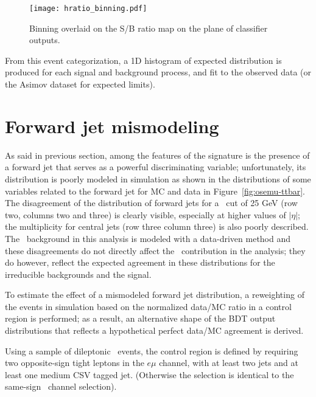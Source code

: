 \begin{figure} [!h]
 \centering
 \texttt{[image: hratio\_binning.pdf]}
\caption{Binning overlaid on the S/B ratio map on the plane of classifier outputs.}
\label{fig:binning}
\end{figure}

From this event categorization, a 1D histogram of expected distribution is produced for each signal and background process, and fit to the observed data (or the Asimov dataset for expected limits).

\section{Forward jet mismodeling}\label{sec:forward_jet_model}

As said in previous section, among the features of the \tHq signature is the presence of a forward jet that serves as a powerful discriminating variable; unfortunately, its \etac distribution is poorly modeled in simulation as shown in the distributions of some variables related to the forward jet for MC and data in Figure~\ref{fig:osemu-ttbar}. The disagreement of the \etac distribution of forward jets for a \pt\ cut of 25 GeV (row two, columns two and three) is clearly visible, especially at higher values of $|\eta|$; the multiplicity for central jets (row three column three) is also poorly described. The \ttbar\ background in this analysis is modeled with a data-driven method and these disagreements do not directly affect the \ttbar\ contribution in the analysis; they do however, reflect the expected agreement in these distributions for the irreducible backgrounds and the signal.

To estimate the effect of a mismodeled forward jet distribution, a reweighting of the events in simulation based on the normalized data/MC ratio in a control region is performed; as a result, an alternative shape of the BDT output distributions that reflects a hypothetical perfect data/MC agreement is derived.

Using a sample of dileptonic \ttbar\ events, the control region is defined by requiring two opposite-sign tight leptons in the $e\mu$ channel, with at least two jets and at least one medium CSV tagged jet. (Otherwise the selection is identical to the same-sign \emu\ channel selection). 

